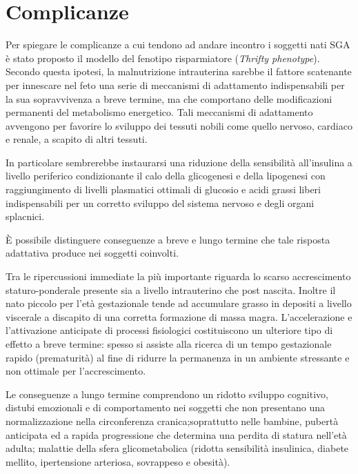   

\section{Complicanze}


Per spiegare le complicanze a cui tendono ad andare incontro i soggetti nati SGA è stato proposto il modello del fenotipo risparmiatore (\textit{Thrifty phenotype}).
Secondo questa ipotesi, la malnutrizione intrauterina sarebbe il fattore scatenante
per innescare nel feto una serie di meccanismi di adattamento indispensabili per 
la sua sopravvivenza a breve termine, ma che comportano delle modificazioni permanenti
del metabolismo energetico.
Tali meccanismi di adattamento avvengono per favorire lo sviluppo dei tessuti 
nobili come quello nervoso, cardiaco e renale, a scapito di altri tessuti.

In particolare sembrerebbe instaurarsi una riduzione della sensibilità all'insulina
a livello periferico condizionante il calo della glicogenesi e della lipogenesi
con raggiungimento di livelli plasmatici ottimali di glucosio e acidi grassi liberi
indispensabili per un corretto sviluppo del sistema nervoso e degli organi splacnici.\cite{sga-51}



\`E possibile distinguere conseguenze a breve e lungo termine che tale risposta
adattativa produce nei soggetti coinvolti.

Tra le ripercussioni immediate la più importante riguarda lo scarso accrescimento
staturo-ponderale presente sia a livello intrauterino che post nascita. Inoltre 
il nato piccolo per l'età gestazionale tende ad accumulare grasso in depositi a livello
viscerale a discapito di una corretta formazione di massa magra. L'accelerazione e 
l'attivazione anticipate di processi fisiologici costituiscono un ulteriore tipo di 
effetto a breve termine: spesso si assiste alla ricerca di un tempo gestazionale
rapido (prematurità) al fine di ridurre la permanenza in un ambiente stressante
e non ottimale per l'accrescimento.\cite{sga-53}

Le conseguenze a lungo termine comprendono un ridotto sviluppo cognitivo, distubi emozionali e di comportamento nei 
soggetti che non presentano una normalizzazione nella circonferenza cranica;soprattutto nelle bambine, pubertà 
anticipata ed a rapida progressione  che determina una perdita di 
statura nell'età adulta; malattie della sfera glicometabolica (ridotta sensibilità insulinica, diabete mellito,
ipertensione arteriosa, sovrappeso e obesità).\cite{sga-32}


